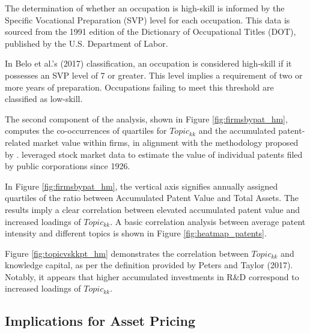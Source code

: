 \documentclass[12pt, letterpaper]{article}
\begin{document}
The determination of whether an occupation is high-skill is informed by the Specific Vocational Preparation (SVP) level for each occupation. This data is sourced from the 1991 edition of the Dictionary of Occupational Titles (DOT), published by the U.S. Department of Labor. 

In Belo et al.'s (2017) classification, an occupation is considered high-skill if it possesses an SVP level of 7 or greater. This level implies a requirement of two or more years of preparation. Occupations failing to meet this threshold are classified as low-skill.


The second component of the analysis, shown in Figure \ref{fig:firmsbypat_hm}, computes the co-occurrences of quartiles for $Topic_{kk}$ and the accumulated patent-related market value within firms, in alignment with the methodology proposed by \cite{Kogan2017-fx}. \cite{Kogan2017-fx} leveraged stock market data to estimate the value of individual patents filed by public corporations since 1926. 

 In Figure \ref{fig:firmsbypat_hm}, the vertical axis signifies annually assigned quartiles of the ratio between Accumulated Patent Value and Total Assets. The results imply a clear correlation between elevated accumulated patent value and increased loadings of $Topic_{kk}$. A basic correlation analysis between average patent intensity and different topics is shown in Figure \ref{fig:heatmap_patents}.


Figure \ref{fig:topicvskkpt_hm} demonstrates the correlation between $Topic_{kk}$ and knowledge capital, as per the definition provided by Peters and Taylor (2017). Notably, it appears that higher accumulated investments in R\&D correspond to increased loadings of $Topic_{kk}$. 


\subsection{Implications for Asset Pricing}
\end{document}
